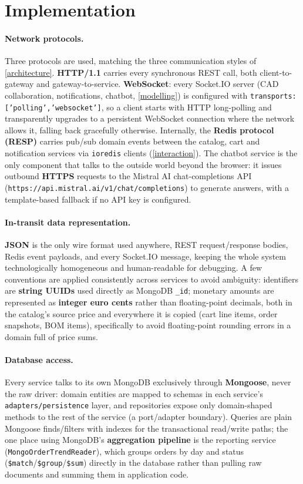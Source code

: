 \section{Implementation}\label{implementation}


\paragraph{Network protocols.} Three protocols are used, matching the three
communication styles of \cref{architecture}. \textbf{HTTP/1.1} carries every
synchronous REST call, both client-to-gateway and gateway-to-service.
\textbf{WebSocket}: every
Socket.IO server (CAD collaboration, notifications, chatbot,
\cref{modelling}) is configured with \texttt{transports:
['polling','websocket']}, so a client starts with HTTP long-polling and
transparently upgrades to a persistent WebSocket connection where the network
allows it, falling back gracefully otherwise.
Internally, the \textbf{Redis protocol (RESP)} carries pub/sub domain
events between the catalog, cart and notification services via
\texttt{ioredis} clients (\cref{interaction}). The chatbot service is
the only component that talks to the outside world beyond the browser: it
issues outbound \textbf{HTTPS} requests to the Mistral AI chat-completions
API (\texttt{https://api.mistral.ai/v1/chat/completions}) to generate
answers, with a template-based fallback if no API key is configured.

\paragraph{In-transit data representation.} \textbf{JSON} is the only
wire format used anywhere, REST request/response bodies, Redis event
payloads, and every Socket.IO message, keeping the whole system
technologically homogeneous and human-readable for debugging. A few
conventions are applied consistently across services to avoid ambiguity:
identifiers are \textbf{string UUIDs} used directly as MongoDB \texttt{\_id}; monetary
amounts are represented as \textbf{integer euro cents} rather than
floating-point decimals, both in the catalog's source price and everywhere it
is copied (cart line items, order snapshots, BOM items), specifically to
avoid floating-point rounding errors in a domain full of price sums.

\paragraph{Database access.} Every service talks to its own MongoDB
exclusively through \textbf{Mongoose}, never the raw driver: domain
entities are mapped to schemas in each service's
\texttt{adapters/persistence} layer, and repositories expose only
domain-shaped methods to the rest of the service (a port/adapter boundary).
Queries are plain Mongoose finds/filters with
indexes for the transactional read/write
paths; the one place using MongoDB's \textbf{aggregation pipeline} is the
reporting service (\texttt{MongoOrderTrendReader}), which groups orders by
day and status (\texttt{\$match}/\texttt{\$group}/\texttt{\$sum}) directly in
the database rather than pulling raw documents and summing them in
application code.

